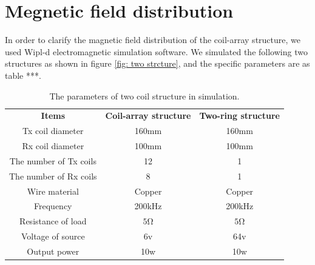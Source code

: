 \section{Megnetic field distribution}
In order to clarify the magnetic field distribution of the coil-array structure, we used Wipl-d electromagnetic simulation software. We simulated the following two structures as shown in figure \ref{fig: two strcture}, and the specific parameters are as table ***.

\begin{table}[!t]
    \centering
    \caption{The parameters of two coil structure in simulation.}
    \begin{tabular}{ c|c|c }
        \thickhline
        \textbf{Items}         & \textbf{Coil-array structure} & \textbf{Two-ring structure} \\
        \thickhline
        Tx coil diameter       & 160mm                         & 160mm                       \\ \hline
        Rx coil diameter       & 100mm                         & 100mm                       \\ \hline
        The number of Tx coils & 12                            & 1                           \\ \hline
        The number of Rx coils & 8                             & 1                           \\ \hline
        Wire material          & Copper                        & Copper                      \\ \hline
        Frequency              & 200kHz                        & 200kHz                      \\ \hline
        Resistance of load     & $5 \si{\ohm}$                 & $5 \si{\ohm}$               \\ \hline
        Voltage of source      & 6v                            & 64v                         \\ \hline
        Output power           & 10w                           & 10w                         \\ \hline
    \end{tabular}
    \label{table: simulation parameters}
\end{table}

